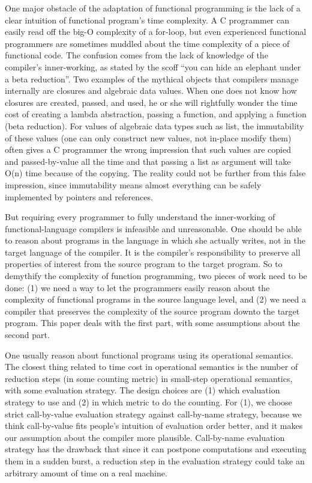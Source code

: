\documentclass[preprint]{sigplanconf}
\begin{document}
One major obstacle of the adaptation of functional programming is the lack of a clear intuition of functional program's time complexity. A C programmer can easily read off the big-O complexity of a for-loop, but even experienced functional programmers are sometimes muddled about the time complexity of a piece of functional code. The confusion comes from the lack of knowledge of the compiler's inner-working, as stated by the scoff ``you can hide an elephant under a beta reduction''. Two examples of the mythical objects that compilers manage internally are closures and algebraic data values. When one does not know how closures are created, passed, and used, he or she will rightfully wonder the time cost of creating a lambda abstraction, passing a function, and applying a function (beta reduction). For values of algebraic data types such as list, the immutability of these values (one can only construct new values, not in-place modify them) often gives a C programmer the wrong impression that such values are copied and passed-by-value all the time and that passing a list as argument will take O(n) time because of the copying. The reality could not be further from this false impression, since immutability means almost everything can be safely implemented by pointers and references.

But requiring every programmer to fully understand the inner-working of functional-language compilers is infeasible and unreasonable. One should be able to reason about programs in the language in which she actually writes, not in the target language of the compiler. It is the compiler's responsibility to preserve all properties of interest from the source program to the target program. So to demythify the complexity of function programming, two pieces of work need to be done: (1) we need a way to let the programmers easily reason about the complexity of functional programs in the source language level, and (2) we need a compiler that preserves the complexity of the source program downto the target program. This paper deals with the first part, with some assumptions about the second part. 

One usually reason about functional programs using its operational semantics. The closest thing related to time cost in operational semantics is the number of reduction steps (in some counting metric) in small-step operational semantics, with some evaluation strategy. The design choices are (1) which evaluation strategy to use and (2) in which metric to do the counting. For (1), we choose strict call-by-value evaluation strategy against call-by-name strategy, because we think call-by-value fits people's intuition of evaluation order better, and it makes our assumption about the compiler more plausible. Call-by-name evaluation strategy has the drawback that since it can postpone computations and executing them in a sudden burst, a reduction step in the evaluation strategy could take an arbitrary amount of time on a real machine.
\end{document}

